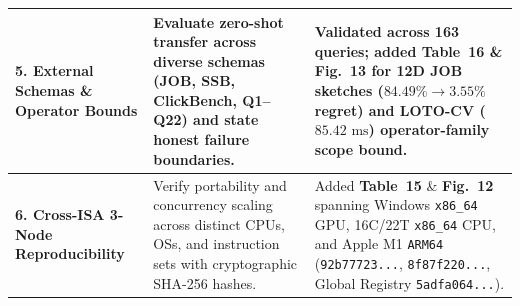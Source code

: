 \documentclass[10pt,a4paper]{article}
\begin{document}
\begin{longtable}{@{}p{}p{}p{}@{}}
\midrule
\textbf{5. External Schemas \& Operator Bounds} & Evaluate zero-shot transfer across diverse schemas (JOB, SSB, ClickBench, Q1--Q22) and state honest failure boundaries. & Validated across 163 queries; added \textbf{Table~16} \& \textbf{Fig.~13} for 12D JOB sketches ($84.49\% \rightarrow 3.55\%$ regret) and LOTO-CV ($85.42\text{ ms}$) operator-family scope bound. \\
\midrule
\textbf{6. Cross-ISA 3-Node Reproducibility} & Verify portability and concurrency scaling across distinct CPUs, OSs, and instruction sets with cryptographic SHA-256 hashes. & Added \textbf{Table~15} \& \textbf{Fig.~12} spanning Windows \texttt{x86\_64} GPU, 16C/22T \texttt{x86\_64} CPU, and Apple M1 \texttt{ARM64} (\texttt{92b77723...}, \texttt{8f87f220...}, Global Registry \texttt{5adfa064...}). \\
\bottomrule
\end{longtable}
\end{document}
